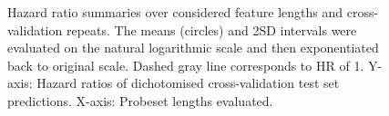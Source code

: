 \documentclass[letterpaper,12pt]{article}
\begin{document}
%
%
\begin{figure}[!th]

\centering
{}
\caption{Hazard ratio summaries over considered feature lengths and cross-validation repeats. The means (circles) and 2SD intervals were evaluated on the natural logarithmic scale and then exponentiated back to original scale. Dashed gray line corresponds to HR of 1. Y-axis: Hazard ratios of dichotomised cross-validation test set predictions. X-axis: Probeset lengths evaluated.}
\label{Fig:PLSCoxHR}
\end{figure}
%
%
\end{document}
